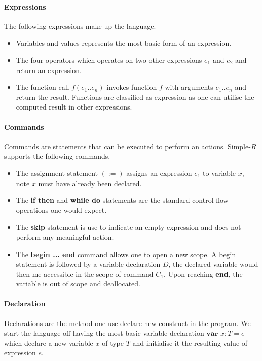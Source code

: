 \documentclass[a4paper,12pt]{report}
\begin{document}
\paragraph{Expressions} The following expressions make up the language.
\begin{itemize}
  \item Variables and values represents the most basic form of an expression.
  \item The four operators which operates on two other expressions $e_1$ 
  and $e_2$ and return an expression.
  \item The function call $f(e_1..e_n)$ invokes function $f$ with arguments 
  $e_1..e_n$ and return the result. Functions are classified as expression as 
  one can utilise the computed result in other expressions. 
\end{itemize}

\paragraph{Commands} Commands are statements that can be executed to perform an 
actions. Simple-$R$ supports the following commands,
\begin{itemize}
  \item The assignment statement $(:=)$ assigns an expression $e_1$ to variable 
  $x$, note $x$ must have already been declared. 
  \item The \textbf{if then} and \textbf{while do} statements are the standard 
  control flow operations one would expect.
  \item The \textbf{skip} statement is use to indicate an empty expression and 
  does not perform any meaningful action. 
  \item The \textbf{begin ... end} command allows one to open a new scope. A 
  begin statement is followed by a variable declaration $D$, the declared 
  variable would then me accessible in the scope of command $C_1$. Upon reaching 
  \textbf{end}, the variable is out of scope and deallocated. 
\end{itemize}

\paragraph{Declaration} Declarations are the method one use declare new construct 
in the program. We start the language off having the most basic variable declaration 
$\textbf{var }x : T = e$ which declare a new variable $x$ of type $T$ and 
initialise it the resulting value of expression $e$.
\end{document}
